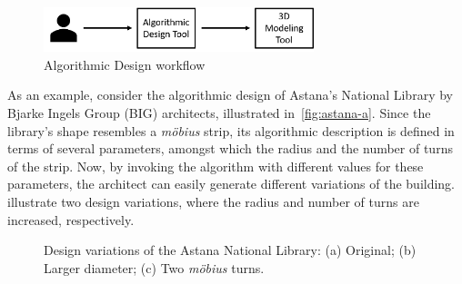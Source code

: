 \begin{figure}[htbp]
\centering
\includegraphics[width=0.70\textwidth]{./Images/Introduction/AlgorithmicArchitecturalDesign.png}
\caption[General view of the Algorithmic Design Approach]{Algorithmic Design workflow}
\label{fig:algorithmicdesign}
\end{figure}
	
	As an example, consider the algorithmic design of Astana's National Library by Bjarke Ingels Group (BIG) architects, illustrated in~\cref{fig:astana-a}. Since the library's shape resembles a \textit{möbius} strip, its algorithmic description is defined in terms of several parameters, amongst which the radius and the number of turns of the strip. Now, by invoking the algorithm with different values for these parameters, the architect can easily generate different variations of the building.  illustrate two design variations, where the radius and number of turns are increased, respectively.
	
\begin{figure}[htbp]
\centering
{}%
\hfill
{}%
\hfill
{}%

\caption[Design variations of the Astana's National Library]{Design variations of the Astana National Library: (a) Original; (b) Larger diameter; (c) Two \textit{möbius} turns.}
\label{fig:astana}
\end{figure}

